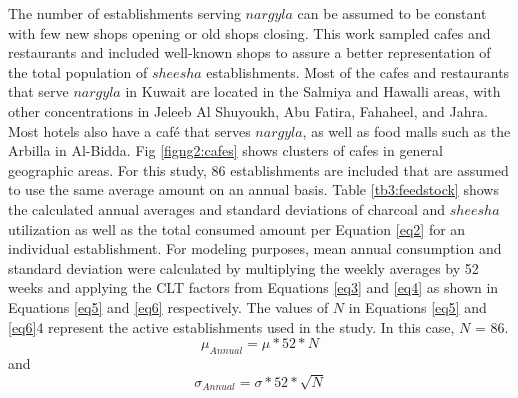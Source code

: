 The number of establishments serving $nargyla$ can be assumed to be constant with few new shops opening or old shops closing.  This work sampled cafes and restaurants and included well-known shops to assure a better representation of the total population of $sheesha$ establishments.   Most of the cafes and restaurants that serve $nargyla$ in Kuwait are located in the Salmiya and Hawalli areas, with other concentrations in Jeleeb Al Shuyoukh, Abu Fatira, Fahaheel, and Jahra.  Most hotels also have a caf\'e that serves $nargyla$, as well as food malls such as the Arbilla in Al-Bidda.  Fig \ref{figng2:cafes} shows clusters of cafes in general geographic areas.  For this study, 86 establishments are included that are assumed to use the same average amount on an annual basis.  Table \ref{tb3:feedstock} shows the calculated annual averages and standard deviations of charcoal and $sheesha$ utilization as well as the total consumed amount per Equation \ref{eq2} for an individual establishment.  For modeling purposes, mean annual consumption and standard deviation were calculated by multiplying the weekly averages by 52 weeks and applying the CLT factors from Equations \ref{eq3} and \ref{eq4} as shown in Equations \ref{eq5} and \ref{eq6} respectively.  The values of $N$ in Equations \ref{eq5} and \ref{eq6}4 represent the active establishments used in the study.  In this case, $N$ = 86.
%
\begin{equation}
\label{eq5}
\mu_{Annual}= \mu*52*N
\end{equation}
%
\noindent
and 
%
\begin{equation}
\label{eq6}
\sigma_{Annual}= \sigma*52*\sqrt{N}
\end{equation}
%
\noindent

%
\begin{table}[H]
\centering
\caption{Feedstock inputs (in kgs) for individual establishments and total annual consumption}
\label{tb3:feedstock}
\end{table}
%

